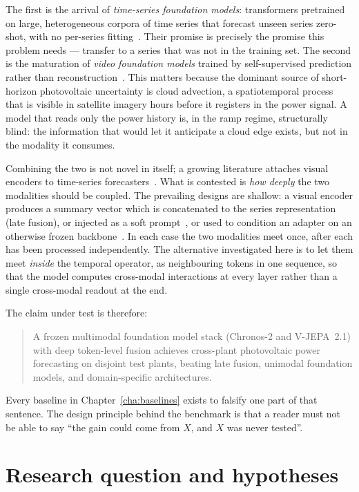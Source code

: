 The first is the arrival of \emph{time-series foundation models}: transformers pretrained
on large, heterogeneous corpora of time series that forecast unseen series zero-shot, with
no per-series fitting~\cite{chronos2,timesfm,tirex}. Their promise is precisely the
promise this problem needs --- transfer to a series that was not in the training set. The
second is the maturation of \emph{video foundation models} trained by self-supervised
prediction rather than reconstruction~\cite{vjepa2}. This matters because the dominant
source of short-horizon photovoltaic uncertainty is cloud advection, a spatiotemporal
process that is visible in satellite imagery hours before it registers in the power signal.
A model that reads only the power history is, in the ramp regime, structurally blind: the
information that would let it anticipate a cloud edge exists, but not in the modality it
consumes.

Combining the two is not novel in itself; a growing literature attaches visual encoders to
time-series forecasters~\cite{timevlm,unicast,solarvlm,crossvivit}. What is contested is
\emph{how deeply} the two modalities should be coupled. The prevailing designs are shallow:
a visual encoder produces a summary vector which is concatenated to the series
representation (late fusion), or injected as a soft prompt~\cite{unicast}, or used to
condition an adapter on an otherwise frozen backbone~\cite{cora}. In each case the two
modalities meet once, after each has been processed independently. The alternative
investigated here is to let them meet \emph{inside} the temporal operator, as neighbouring
tokens in one sequence, so that the model computes cross-modal interactions at every layer
rather than a single cross-modal readout at the end.

The claim under test is therefore:

\begin{quote}
  A frozen multimodal foundation model stack (Chronos-2 and V-JEPA~2.1) with deep
  token-level fusion achieves cross-plant photovoltaic power forecasting on disjoint test
  plants, beating late fusion, unimodal foundation models, and domain-specific
  architectures.
\end{quote}

Every baseline in Chapter~\ref{cha:baselines} exists to falsify one part of that sentence.
The design principle behind the benchmark is that a reader must not be able to say ``the
gain could come from $X$, and $X$ was never tested''.

\section{Research question and hypotheses}
\label{sec:rq}

